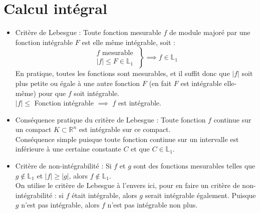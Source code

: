 \documentclass[a4paper]{article}
\begin{document}
\section{Calcul intégral}











\begin{itemize}












\item Critère de Lebesgue : Toute fonction mesurable $ f $ de module majoré par une fonction intégrable $ F $ est elle même intégrable, soit : 
\[
\left.
    \begin{aligned}
        f \text{ mesurable } \\
        | f | \leq F \in \mathbb{L}_1
    \end{aligned}
\right\}
\implies f \in \mathbb{L}_1
\]
En pratique, toutes les fonctions sont mesurables, et il suffit donc que $ | f | $ soit plus petite ou égale à une autre fonction $ F $ (en fait $ F $ est intégrable elle-même) pour que $ f $ soit intégrable. \\
$ | f | \leq $ Fonction intégrable $ \implies $ $ f $ est intégrable.






\item Conséquence pratique du critère de Lebesgue : Toute fonction $ f $ continue sur un compact $ K \subset \mathbb{R}^n $ est intégrable sur ce compact. \\
Conséquence simple puisque toute fonction continue sur un intervalle est inférieure à une certaine constante $ C $ et que $ C \in \mathbb{L}_1 $.






\item Critère de non-intégrabilité : Si $ f $ et $ g $ sont des fonctions mesurables telles que 
$ g \notin \mathbb{L}_1 $ et $ | f | \geq | g | $, alors $ f \notin \mathbb{L}_1 $. \\
On utilise le critère de Lebesgue à l'envers ici, pour en faire un critère de non-intégrabilité : si $ f $ était intégrable, alors $ g $ serait intégrable également. Puisque $ g $ n'est pas intégrable, alors $ f $ n'est pas intégrable non plus.







\end{itemize}
\end{document}
